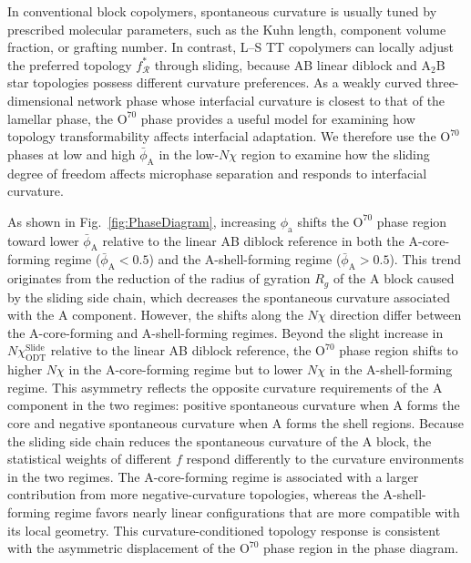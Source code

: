 In conventional block copolymers, spontaneous curvature is usually tuned by prescribed molecular parameters, such as the Kuhn length, component volume fraction, or grafting number\cite{Xu2024Architectural}.
In contrast, L--S TT copolymers can locally adjust the preferred topology $f_{\mathcal{R}}^\ast$ through sliding, because AB linear diblock and A$_2$B star topologies possess different curvature preferences.
As a weakly curved three-dimensional network phase whose interfacial curvature is closest to that of the lamellar phase, the $\mathrm{O}^{70}$ phase provides a useful model for examining how topology transformability affects interfacial adaptation.
We therefore use the $\mathrm{O}^{70}$ phases at low and high $\bar{\phi}_{\mathrm A}$ in the low-$N\chi$ region to examine how the sliding degree of freedom affects microphase separation and responds to interfacial curvature.


As shown in Fig.~\ref{fig:PhaseDiagram}, increasing $\phi_\mathrm{a}$ shifts the $\mathrm{O}^{70}$ phase region toward lower $\bar{\phi}_\mathrm{A}$ relative to the linear AB diblock reference in both the A-core-forming regime ($\bar{\phi}_\mathrm{A}<0.5$) and the A-shell-forming regime ($\bar{\phi}_\mathrm{A}>0.5$).
This trend originates from the reduction of the radius of gyration $R_g$ of the A block caused by the sliding side chain, which decreases the spontaneous curvature associated with the A component.
However, the shifts along the $N\chi$ direction differ between the A-core-forming and A-shell-forming regimes.
Beyond the slight increase in $N\chi_{\mathrm{ODT}}^{\mathrm{Slide}}$ relative to the linear AB diblock reference, the $\mathrm{O}^{70}$ phase region shifts to higher $N\chi$ in the A-core-forming regime but to lower $N\chi$ in the A-shell-forming regime.
This asymmetry reflects the opposite curvature requirements of the A component in the two regimes: positive spontaneous curvature when A forms the core and negative spontaneous curvature when A forms the shell regions.
Because the sliding side chain reduces the spontaneous curvature of the A block, the statistical weights of different $f$ respond differently to the curvature environments in the two regimes.
The A-core-forming regime is associated with a larger contribution from more negative-curvature topologies, whereas the A-shell-forming regime favors nearly linear configurations that are more compatible with its local geometry.
This curvature-conditioned topology response is consistent with the asymmetric displacement of the $\mathrm{O}^{70}$ phase region in the phase diagram.


